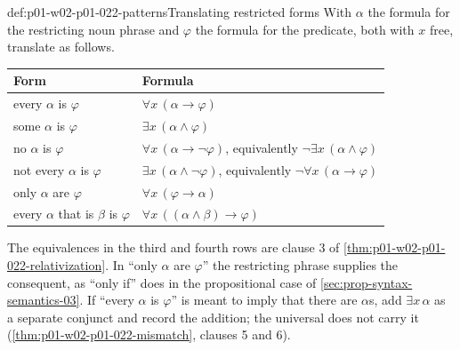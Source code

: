 \begin{hbmethod}{def:p01-w02-p01-022-patterns}{Translating restricted forms}
With \(\alpha\) the formula for the restricting noun phrase and \(\varphi\)
the formula for the predicate, both with \(x\) free, translate as follows.
\begin{center}
\begin{tabular}{@{}ll@{}}
\toprule
Form & Formula \\
\midrule
every \(\alpha\) is \(\varphi\) & \(\forall x\,(\alpha\to\varphi)\) \\
some \(\alpha\) is \(\varphi\) & \(\exists x\,(\alpha\land\varphi)\) \\
no \(\alpha\) is \(\varphi\) & \(\forall x\,(\alpha\to\neg\varphi)\),
  equivalently \(\neg\exists x\,(\alpha\land\varphi)\) \\
not every \(\alpha\) is \(\varphi\) & \(\exists x\,(\alpha\land\neg\varphi)\),
  equivalently \(\neg\forall x\,(\alpha\to\varphi)\) \\
only \(\alpha\) are \(\varphi\) & \(\forall x\,(\varphi\to\alpha)\) \\
every \(\alpha\) that is \(\beta\) is \(\varphi\) &
  \(\forall x\,((\alpha\land\beta)\to\varphi)\) \\
\bottomrule
\end{tabular}
\end{center}
The equivalences in the third and fourth rows are clause 3 of
\cref{thm:p01-w02-p01-022-relativization}. In ``only \(\alpha\) are
\(\varphi\)'' the restricting phrase supplies the consequent, as ``only if''
does in the propositional case of \cref{sec:prop-syntax-semantics-03}. If
``every \(\alpha\) is \(\varphi\)'' is meant to imply that there are
\(\alpha\)s, add \(\exists x\,\alpha\) as a separate conjunct and record the
addition; the universal does not carry it
(\cref{thm:p01-w02-p01-022-mismatch}, clauses 5 and 6).
\end{hbmethod}

